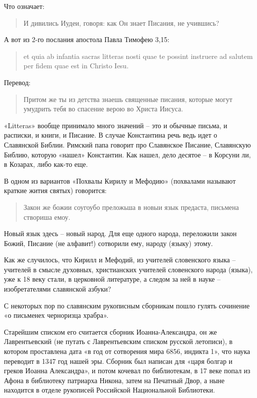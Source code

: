 \documentclass[a5paper,11pt,openany]{article}
\begin{document}
Что означает:

\begin{quotation}
И дивились Иудеи, говоря: как Он знает Писания, не учившись? 
\end{quotation}

А вот из 2-го послания апостола Павла Тимофею 3,15:

\begin{quotation}
\begin{otherlanguage}{latin}
et quia ab infantia sacras litteras nosti quae te possint instruere ad salutem per fidem quae est in Christo Iesu.
\end{otherlanguage}
\end{quotation}

Перевод:

\begin{quotation}
Притом же ты из детства знаешь священные писания, которые могут умудрить тебя во спасение верою во Христа Иисуса. 
\end{quotation}

«Litteras» вообще принимало много значений – это и обычные письма, и расписки, и книги, и Писание. В случае Константина речь ведь идет о Славянской Библии. Римский папа говорит про Славянское Писание, Славянскую Библию, которую «нашел» Константин. Как нашел, дело десятое – в Корсуни ли, в Козарах, либо как-то еще.

В одном из вариантов «Похвалы Кирилу и Мефодию» (похвалами называют краткие жития святых) говорится:

\begin{quotation}
Закон же божии соугоубо преложьша в новыи язык предаста, письмена створиша емоу.
\end{quotation}

Новый язык здесь – новый народ. Для еще одного народа, переложили закон Божий, Писание (не алфавит!) сотворили ему, народу (языку) этому. 

Как же случилось, что Кирилл и Мефодий, из учителей словенского языка – учителей в смысле духовных, христианских учителей словенского народа (языка), уже к 18 веку стали, в церковной литературе, а следом за ней в науке – изобретателями славянской азбуки?

С некоторых пор по славянским рукописным сборникам пошло гулять сочинение «о письменех черноризца храбра».

Старейшим списком его считается сборник Иоанна-Александра, он же Лаврентьевский (не путать с Лаврентьевским списком русской летописи), в котором проставлена дата «в год от сотворения мира 6856, индикта 1», что наука переводит в 1347 год нашей эры. Сборник был написан для «царя болгар и греков Иоанна Александра», и потом кочевал по библиотекам, в 17 веке попал из Афона в библиотеку патриарха Никона, затем на Печатный Двор, а ныне находится в отделе рукописей Российской Национальной Библиотеки.
\end{document}
